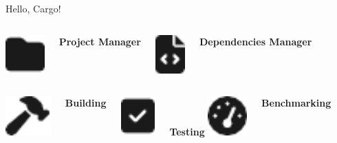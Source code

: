 \begin{frame}{Hello, Cargo!}
    \begin{columns}[t, onlytextwidth]
            \centering
            \includegraphics[height=1.5cm, keepaspectratio]{images/folder.pdf}

            \textbf{Project Manager}

            \centering
            \includegraphics[height=1.5cm, keepaspectratio]{images/file-code.pdf}

            \textbf{Dependencies Manager}
    \end{columns}

    \vspace{1cm}

    \begin{columns}[t, onlytextwidth]
            \centering
            \includegraphics[height=1.5cm, keepaspectratio]{images/hammer.pdf}

            \textbf{Building}

            \centering
            \includegraphics[height=1.5cm, keepaspectratio]{images/square-check.pdf}

            \textbf{Testing}
            \centering
            \includegraphics[height=1.5cm, keepaspectratio]{images/gauge.pdf}

            \textbf{Benchmarking}
    \end{columns}
\end{frame}

